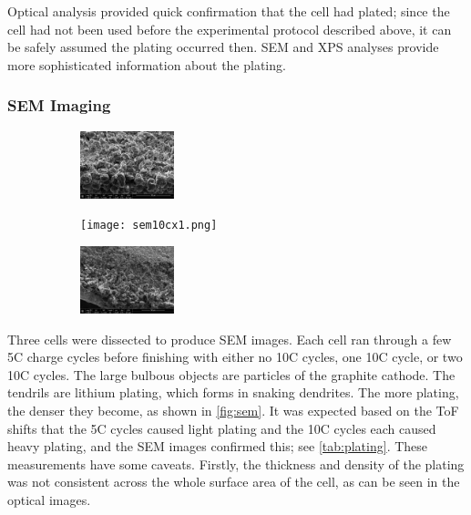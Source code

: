 Optical analysis provided quick confirmation that the cell had plated; since the cell had not been used before the experimental protocol described above, it can be safely assumed the plating occurred then. SEM and XPS analyses provide more sophisticated information about the plating. 

\subsubsection{SEM Imaging}
\begin{figure}[t!]\label{fig:sem}
\centering
\caption{SEM images of cells after experiencing a few 5C cycles and either zero (left), one (center), or two (right) 10C cycles.}
     \begin{subfigure}
         \centering
         \includegraphics[width=0.3\textwidth]{sem5c.png}
     \end{subfigure}
     \hfill
     \begin{subfigure}
         \centering
         \texttt{[image: sem10cx1.png]}
     \end{subfigure}
     \hfill
     \begin{subfigure}
         \centering
         \includegraphics[width=0.3\textwidth]{sem10cx2.png}
     \end{subfigure}
\end{figure}

Three cells were dissected to produce SEM images. Each cell ran through a few 5C charge cycles before finishing with either no 10C cycles, one 10C cycle, or two 10C cycles. The large bulbous objects are particles of the graphite cathode. The tendrils are lithium plating, which forms in snaking dendrites. The more plating, the denser they become, as shown in \hyperref[fig:sem]{\cref{fig:sem}}.  It was expected based on the ToF shifts that the 5C cycles caused light plating and the 10C cycles each caused heavy plating, and the SEM images confirmed this; see \hyperref[tab:plating]{\cref{tab:plating}}. These measurements have some caveats. Firstly, the thickness and density of the plating was not consistent across the whole surface area of the cell, as can be seen in the optical images. 


